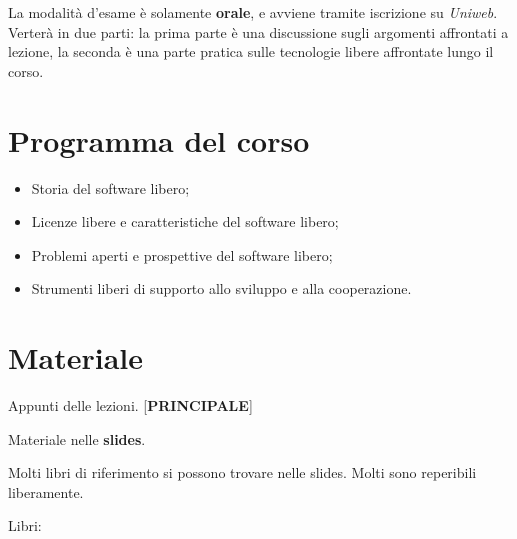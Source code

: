 La modalità d'esame è solamente \textbf{orale}, e avviene tramite iscrizione su \textit{Uniweb}. Verterà in due parti: la prima parte è una discussione sugli argomenti affrontati a lezione, la seconda è una parte pratica sulle tecnologie libere affrontate lungo il corso.

\section{Programma del corso}

\begin{itemize}

\item Storia del software libero;
\item Licenze libere e caratteristiche del software libero;
\item Problemi aperti e prospettive del software libero;
\item Strumenti liberi di supporto allo sviluppo e alla cooperazione.

\end{itemize}

\section{Materiale}

Appunti delle lezioni. [\textbf{PRINCIPALE}]

Materiale nelle \textbf{slides}.

Molti libri di riferimento si possono trovare nelle slides. Molti sono reperibili liberamente.

Libri:

